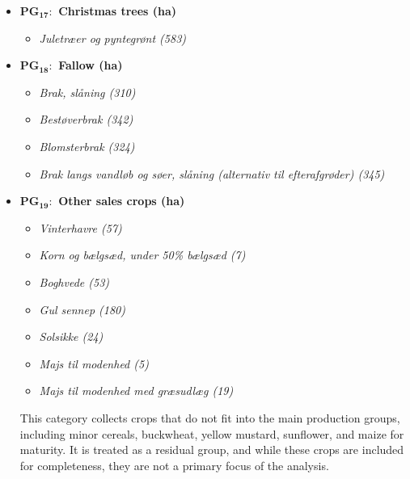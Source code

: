 \documentclass[12pt]{article}
\begin{document}
\begin{itemize}
\begin{itemize}
        \item[$+$] \textit{Asparges (401)}
        \item[$+$] \textit{Jordbær (513)}
        \item[$+$] \textit{Sødkirsebær uden undervækst af græs (524)}
        \item[$+$] \textit{Æbler (528)}
        \item[$+$] \textit{Centnergræskar (553)}
        \item[$+$] \textit{Spinat (422)}
        \item[$+$] \textit{Blandet frugt (539)}
        \item[$+$] \textit{Vindrue (530)}
    \end{itemize}
    This production branch includes horticultural crops such as vegetables, fruits, and specialty crops. 
    These crops are grouped together because they are minor in area compared to the main cereals and forage crops.
    
    \item[] \textbf{PG$_{\textbf{17}}:$ Christmas trees (ha)}
    \begin{itemize}
        \item[$+$] \textit{Juletræer og pyntegrønt (583)}
    \end{itemize}
    \item[] \textbf{PG$_{\textbf{18}}:$ Fallow (ha)}
    \begin{itemize}
        \item[$+$] \textit{Brak, slåning (310)}
        \item[$+$] \textit{Bestøverbrak (342)}
        \item[$+$] \textit{Blomsterbrak (324)}
        \item[$+$] \textit{Brak langs vandløb og søer, slåning (alternativ til efterafgrøder) (345)}
    \end{itemize}
    \item[] \textbf{PG$_{\textbf{19}}:$ Other sales crops (ha)}
    \begin{itemize}
        \item[$+$] \textit{Vinterhavre (57)}
        \item[$+$] \textit{Korn og bælgsæd, under 50\% bælgsæd (7)}
        \item[$+$] \textit{Boghvede (53)}
        \item[$+$] \textit{Gul sennep (180)}
        \item[$+$] \textit{Solsikke (24)}
        \item[$+$] \textit{Majs til modenhed (5)}
        \item[$+$] \textit{Majs til modenhed med græsudlæg (19)}
    \end{itemize}
    This category collects crops that do not fit into the main production groups, including minor cereals, buckwheat, yellow mustard, sunflower, and maize for maturity. It is treated as a residual group, and while these crops are included for completeness, they are not a primary focus of the analysis.
\end{itemize}
\end{document}

